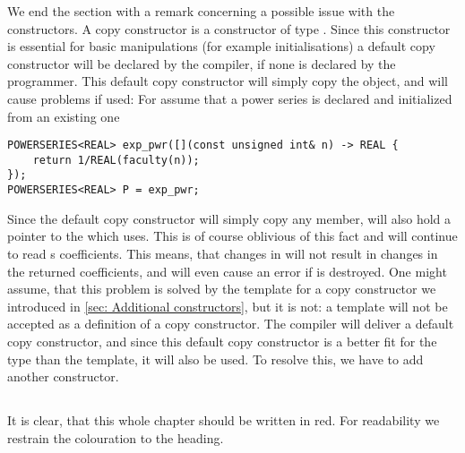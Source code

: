 We end the section with a remark concerning a possible issue with the constructors. A copy constructor is a constructor of type . Since this constructor is essential for basic manipulations (for example initialisations) a default copy constructor will be declared by the compiler, if none is declared by the programmer. This default copy constructor will simply copy the object, and will cause problems if used: For assume that a power series is declared and initialized from an existing one
\begin{lstlisting}
POWERSERIES<REAL> exp_pwr([](const unsigned int& n) -> REAL {
	return 1/REAL(faculty(n));
});
POWERSERIES<REAL> P = exp_pwr;
\end{lstlisting}
Since the default copy constructor will simply copy any member,  will also hold a pointer to the  which  uses. This  is of course oblivious of this fact and will continue to read s coefficients. This means, that changes in  will not result in changes in the returned coefficients, and will even cause an error if  is destroyed. One might assume, that this problem is solved by the template for a copy constructor we introduced in \cref{sec: Additional constructors}, but it is not: a template will not be accepted as a definition of a copy constructor. The compiler will deliver a default copy constructor, and since this default copy constructor is a better fit for the type than the template, it will also be used. To resolve this, we have to add another constructor.

\subsection{}

It is clear, that this whole chapter should be written in red. For readability we restrain the colouration to the heading.
\newpage